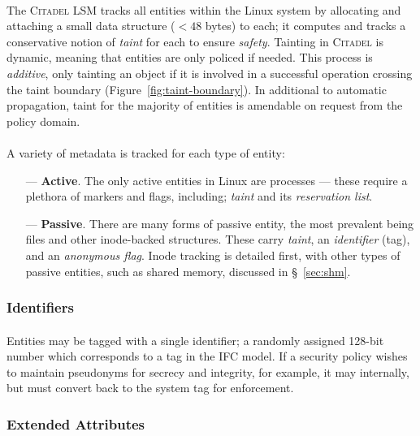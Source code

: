 \paragraph{} The \textsc{Citadel} LSM tracks all entities within the Linux system by allocating and attaching a small data structure ($<48$ bytes) to each; it computes and tracks a conservative notion of \textit{taint} for each to ensure \textit{safety}. Tainting in \textsc{Citadel} is dynamic, meaning that entities are only policed if needed. This process is \textit{additive}, only tainting an object if it is involved in a successful operation crossing the taint boundary (Figure~\ref{fig:taint-boundary}). In additional to automatic propagation, taint for the majority of entities is amendable on request from the policy domain.

\paragraph{} A variety of metadata is tracked for each type of entity:

\begin{enumerate}
    \item[---]\textbf{Active}. The only active entities in Linux are processes --- these require a plethora of markers and flags, including; \textit{taint} and its \textit{reservation list}.
    \item[---] \textbf{Passive}. There are many forms of passive entity, the most prevalent being files and other inode-backed structures. These carry \textit{taint}, an \textit{identifier} (tag), and an \textit{anonymous flag}. Inode tracking is detailed first, with other types of passive entities, such as shared memory, discussed in §~\ref{sec:shm}.
\end{enumerate}

\subsubsection{Identifiers}
\paragraph{} Entities may be tagged with a single identifier; a randomly assigned 128-bit number which corresponds to a tag in the IFC model. If a security policy wishes to maintain pseudonyms for secrecy and integrity, for example, it may internally, but must convert back to the system tag for enforcement.

\subsubsection{Extended Attributes} 
